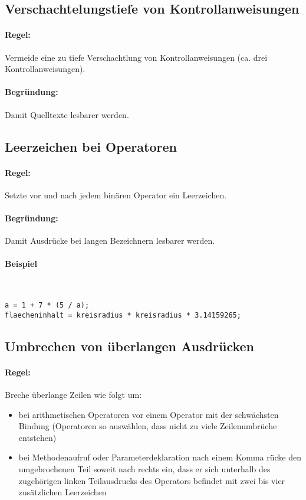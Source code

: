 \subsection{Verschachtelungstiefe von Kontrollanweisungen}

\paragraph{Regel:} Vermeide eine zu tiefe Verschachtlung von Kontrollanweisungen (ca. drei Kontrollanweisungen).
\paragraph{Begründung:} Damit Quelltexte lesbarer werden.

\subsection{Leerzeichen bei Operatoren}

\paragraph{Regel:} Setzte vor und nach jedem binären Operator ein Leerzeichen.
\paragraph{Begründung:} Damit Ausdrücke bei langen Bezeichnern lesbarer werden.

\paragraph{Beispiel} \hspace{0pt}\\
\begin{lstlisting}
a = 1 + 7 * (5 / a);
flaecheninhalt = kreisradius * kreisradius * 3.14159265;
\end{lstlisting}

\subsection{Umbrechen von überlangen Ausdrücken}

\paragraph{Regel:} Breche überlange Zeilen wie folgt um:
\begin{itemize}
\item bei arithmetischen Operatoren vor einem Operator mit der schwächsten Bindung (Operatoren so auswählen, dass nicht zu viele Zeilenumbrüche entstehen)
\item bei Methodenaufruf oder Parameterdeklaration nach einem Komma
rücke den umgebrochenen Teil soweit nach rechts ein, dass er sich unterhalb des zugehörigen linken Teilausdrucks des Operators befindet mit zwei bis vier zusätzlichen Leerzeichen
\end{itemize}
